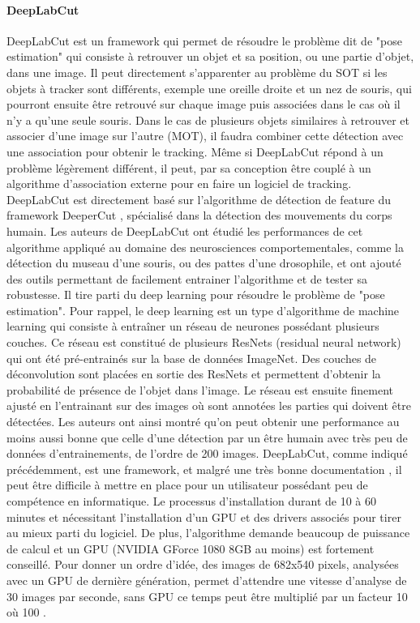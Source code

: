   \paragraph{DeepLabCut}
  DeepLabCut \cite{mathis2018deeplabcut} est un framework qui permet de résoudre le problème dit de "pose estimation" qui consiste à retrouver un objet et sa position, ou une partie d'objet, dans une image. Il peut directement s'apparenter au problème du SOT si les objets à tracker sont différents, exemple une oreille droite et un nez de souris, qui pourront ensuite être retrouvé sur chaque image puis associées dans le cas où il n'y a qu'une seule souris. Dans le cas de plusieurs objets similaires à retrouver et associer d'une image sur l'autre (MOT), il faudra combiner cette détection avec une association pour obtenir le tracking. Même si DeepLabCut répond à un problème légèrement différent, il peut, par sa conception être couplé à un algorithme d'association externe pour en faire un logiciel de tracking.
\medbreak
  DeepLabCut est directement basé sur l'algorithme de détection de feature du framework DeeperCut \cite{insafutdinov2016deepercut}, spécialisé dans la détection des mouvements du corps humain. Les auteurs de DeepLabCut ont étudié les performances de cet algorithme appliqué au domaine des neurosciences comportementales, comme la détection du museau d'une souris, ou des pattes d'une drosophile, et ont ajouté des outils permettant de facilement entrainer l’algorithme et de tester sa robustesse. Il tire parti du deep learning pour résoudre le problème de "pose estimation". Pour rappel, le deep learning est un type d'algorithme de machine learning qui consiste à entraîner un réseau de neurones possédant plusieurs couches. Ce réseau est constitué de plusieurs ResNets (residual neural network) qui ont été pré-entrainés sur la base de données ImageNet. Des couches de déconvolution sont placées en sortie des ResNets et permettent d'obtenir la probabilité de présence de l'objet dans l'image. Le réseau est ensuite finement ajusté en l’entrainant sur des images où sont annotées les parties qui doivent être détectées. Les auteurs ont ainsi montré qu'on peut obtenir une performance au moins aussi bonne que celle d'une détection par un être humain avec très peu de données d’entrainements, de l'ordre de 200 images.
\medbreak
  DeepLabCut, comme indiqué précédemment, est une framework, et malgré une très bonne documentation \cite{nath2019using}, il peut être difficile à mettre en place pour un utilisateur possédant peu de compétence en informatique. Le processus d'installation durant de 10 à 60 minutes et nécessitant l'installation d'un GPU et des drivers associés pour tirer au mieux parti du logiciel. De plus, l'algorithme demande beaucoup de puissance de calcul et un GPU (NVIDIA GForce 1080 8GB au moins) est fortement conseillé. Pour donner un ordre d'idée, des images de 682x540 pixels, analysées avec un GPU de dernière génération, permet d'attendre une vitesse d'analyse de 30 images par seconde, sans GPU ce temps peut être multiplié par un facteur 10 où 100 \cite{mathis2018inference}.
